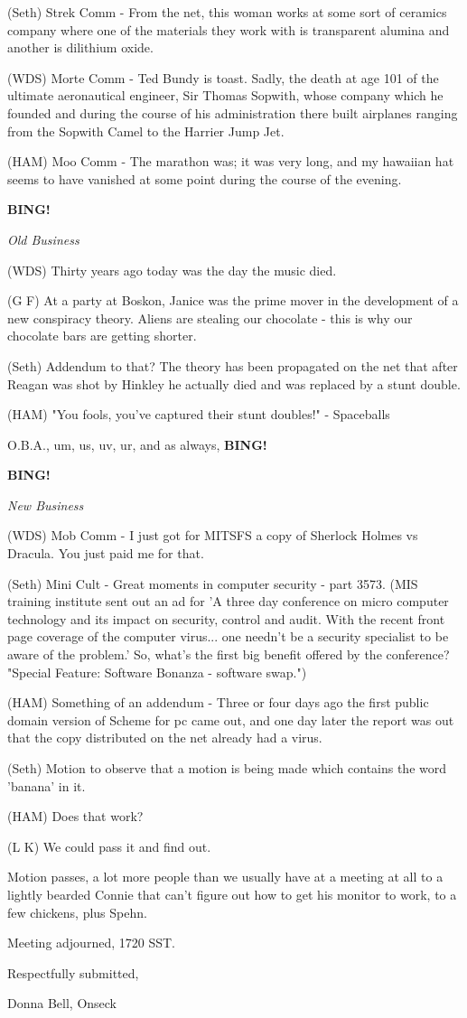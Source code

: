 \documentclass[12pt]{article}
\newcommand{\bing}{{\bf BING!} }
\newcommand{\goto}[1]{\bing \vskip 12pt \centerline{{\em{#1}}}}
\begin{document}
(Seth) Strek Comm - From the net, this woman works at some sort of ceramics company where one of the materials they work with is transparent alumina and another is dilithium oxide.

(WDS) Morte Comm - Ted Bundy is toast.  Sadly, the death at age 101 of the ultimate aeronautical engineer, Sir Thomas Sopwith, whose company which he founded and during the course of his administration there built airplanes ranging from the Sopwith Camel to the Harrier Jump Jet.

(HAM) Moo Comm - The marathon was; it was very long, and my hawaiian hat seems to have vanished at some point during the course of the evening.

\goto{Old Business}

(WDS) Thirty years ago today was the day the music died.

(G F) At a party at Boskon, Janice was the prime mover in the development of a new conspiracy theory.  Aliens are stealing our chocolate - this is why our chocolate bars are getting shorter.

(Seth) Addendum to that?  The theory has been propagated on the net that after Reagan was shot by Hinkley he actually died and was replaced by a stunt double.

(HAM) "You fools, you've captured their stunt doubles!" - Spaceballs

O.B.A., um, us, uv, ur, and as always, \bing

\goto{New Business}

(WDS) Mob Comm - I just got for MITSFS a copy of Sherlock Holmes vs Dracula. You just paid me for that.

(Seth) Mini Cult - Great moments in computer security - part 3573. (MIS training institute sent out an ad for 'A three day conference on micro computer technology and its impact on security, control and audit.  With the recent front page coverage of the computer virus... one needn't be a security specialist to be aware of the problem.'
So, what's the first big benefit offered by the conference? "Special Feature: Software Bonanza - software swap.")

(HAM) Something of an addendum - Three or four days ago the first public domain version of Scheme for pc came out, and one day later the report was out that the copy distributed on the net already had a virus. 

(Seth) Motion to observe that a motion is being made which contains the word 'banana' in it.

(HAM) Does that work?

(L K) We could pass it and find out.

Motion passes, a lot more people than we usually have at a meeting at all to a lightly bearded Connie that can't figure out how to get his monitor to work, to a few chickens, plus Spehn.

\vspace{12pt}

\noindent
Meeting adjourned, 1720 SST.

\vspace{18pt}

\centerline{Respectfully submitted,}
\centerline{Donna Bell, Onseck}
\end{document}
